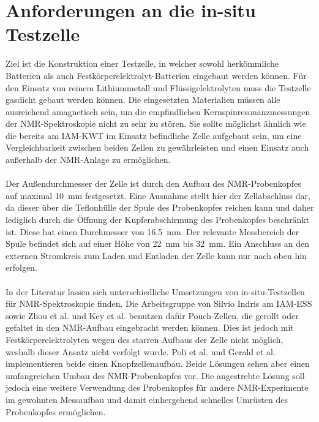 \documentclass[a4paper, 11pt, headsepline,footsepline,twoside,abstract]{scrbook}
\begin{document}
\section{Anforderungen an die in-situ Testzelle}
Ziel ist die Konstruktion einer Testzelle, in welcher sowohl herkömmliche Batterien als auch Festkörperelektrolyt-Batterien eingebaut werden können. Für den Einsatz von reinem Lithium\-metall und Flüssigelektrolyten muss die Testzelle gasdicht gebaut werden können. Die eingesetzten Materialien müssen alle ausreichend amagnetisch sein, um die empfindlichen Kernspinresonanzmessungen der NMR-Spektroskopie nicht zu sehr zu stören. Sie sollte möglichst ähnlich wie die bereits am IAM-KWT im Einsatz befindliche Zelle aufgebaut sein, um eine Vergleichbarkeit zwischen beiden Zellen zu gewährleisten und einen Einsatz auch außerhalb der NMR-Anlage zu ermöglichen. 
\\\\
Der Außendurchmesser der Zelle ist durch den Aufbau des NMR-Probenkopfes auf maximal \SI{10}{\milli\metre} festgesetzt. Eine Ausnahme stellt hier der Zellabschluss dar, da dieser über die Teflonhülle der Spule des Probenkopfes reichen kann und daher lediglich durch die Öffnung der Kupferabschirmung des Probenkopfes beschränkt ist. Diese hat einen Durchmesser von \SI{16.5}{\milli\metre}. Der relevante Messbereich der Spule befindet sich auf einer Höhe von \SI{22}{\milli\metre} bis \SI{32}{\milli\metre}. Ein Anschluss an den externen Stromkreis zum Laden und Entladen der Zelle kann nur nach oben hin erfolgen.
\\\\
In der Literatur lassen sich unterschiedliche Umsetzungen von in-situ-Testzellen für NMR-Spektroskopie finden. Die Arbeitsgruppe von Silvio Indris am IAM-ESS sowie Zhou et al. \cite{zhou2013paramagnetic} und Key et al. \cite{key2009real} benutzen dafür Pouch-Zellen, die gerollt oder gefaltet in den NMR-Aufbau eingebracht werden können. Dies ist jedoch mit Festkörperelektrolyten wegen des starren Aufbaus der Zelle nicht möglich, weshalb dieser Ansatz nicht verfolgt wurde.  Poli et al. \cite{poli2011new} und Gerald et al. \cite{gerald2001situ} implementieren beide einen Knopfzellenaufbau. Beide Lösungen sehen aber einen umfangreichen Umbau des NMR-Probenkopfes vor. Die angestrebte Lösung soll jedoch eine weitere Verwendung des Probenkopfes für andere NMR-Experimente im gewohnten Messaufbau und damit einhergehend schnelles Umrüsten des Probenkopfes ermöglichen.
\end{document}
